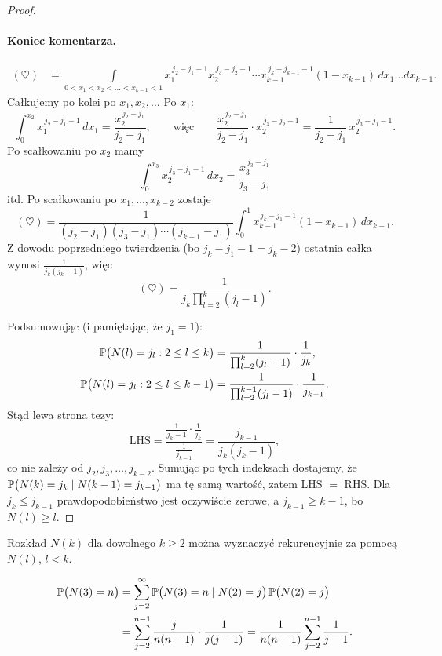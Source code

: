 \documentclass[dvipsnames]{book}
\begin{document}
\begin{proof}
\paragraph{Koniec komentarza.}
\begin{align*}
  (\heartsuit)
  &= \int\limits_{0 < x_1 < x_2 < \ldots < x_{k-1} < 1}
    x_1^{\,j_2 - j_1 - 1} x_2^{\,j_3 - j_2 - 1} \cdots
    x_{k-1}^{\,j_k - j_{k-1} - 1} (1 - x_{k-1})\, dx_1 \ldots dx_{k-1}.
\end{align*}
Całkujemy po kolei po $x_1, x_2, \ldots$ Po $x_1$:
\[
  \int_0^{x_2} x_1^{\,j_2 - j_1 - 1}\, dx_1 = \frac{x_2^{\,j_2 - j_1}}{j_2 - j_1},
  \qquad\text{więc}\qquad
  \frac{x_2^{\,j_2 - j_1}}{j_2 - j_1} \cdot x_2^{\,j_3 - j_2 - 1}
  = \frac{1}{j_2 - j_1}\, x_2^{\,j_3 - j_1 - 1}.
\]
Po scałkowaniu po $x_2$ mamy
\[
  \int_0^{x_3} x_2^{\,j_3 - j_1 - 1}\, dx_2 = \frac{x_3^{\,j_3 - j_1}}{j_3 - j_1}
\]
itd. Po scałkowaniu po $x_1, \ldots, x_{k-2}$ zostaje
\[
  (\heartsuit) = \frac{1}{(j_2 - j_1)(j_3 - j_1) \cdots (j_{k-1} - j_1)}
  \int_0^1 x_{k-1}^{\,j_k - j_1 - 1} (1 - x_{k-1})\, dx_{k-1}.
\]
Z dowodu poprzedniego twierdzenia (bo $j_k - j_1 - 1 = j_k - 2$) ostatnia
całka wynosi $\frac{1}{j_k (j_k - 1)}$, więc
\[
  (\heartsuit) = \frac{1}{j_k \prod_{l=2}^{k} (j_l - 1)}.
\]

Podsumowując (i pamiętając, że $j_1 = 1$):
\begin{align*}
  \P\big(N(l) = j_l : 2 \leq l \leq k\big)
    &= \frac{1}{\prod_{l=2}^{k} (j_l - 1)} \cdot \frac{1}{j_k}, \\
  \P\big(N(l) = j_l : 2 \leq l \leq k-1\big)
    &= \frac{1}{\prod_{l=2}^{k-1} (j_l - 1)} \cdot \frac{1}{j_{k-1}}.
\end{align*}
Stąd lewa strona tezy:
\[
  \text{LHS}
  = \frac{\frac{1}{j_k - 1} \cdot \frac{1}{j_k}}{\frac{1}{j_{k-1}}}
  = \frac{j_{k-1}}{j_k (j_k - 1)},
\]
co nie zależy od $j_2, j_3, \ldots, j_{k-2}$. Sumując po tych indeksach
dostajemy, że $\P\big(N(k) = j_k \mid N(k-1) = j_{k-1}\big)$ ma tę samą
wartość, zatem LHS $=$ RHS. Dla $j_k \leq j_{k-1}$ prawdopodobieństwo jest
oczywiście zerowe, a $j_{k-1} \geq k-1$, bo $N(l) \geq l$.
\end{proof}

\begin{wniosek}
Rozkład $N(k)$ dla dowolnego $k \geq 2$ można wyznaczyć rekurencyjnie
za pomocą $N(l)$, $l < k$.
\end{wniosek}

\begin{przyklad}
\begin{align*}
  \P\big(N(3) = n\big)
  &= \sum_{j=2}^{\infty} \P\big(N(3) = n \mid N(2) = j\big)\,
     \P\big(N(2) = j\big) \\
  &= \sum_{j=2}^{n-1} \frac{j}{n(n-1)} \cdot \frac{1}{j(j-1)}
   = \frac{1}{n(n-1)} \sum_{j=2}^{n-1} \frac{1}{j-1}.
\end{align*}
\end{przyklad}
\end{document}

